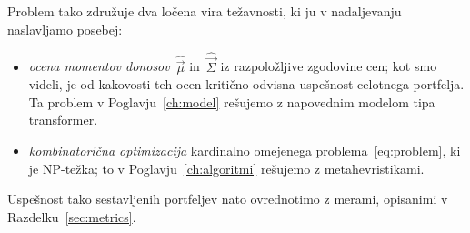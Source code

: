 \noindent Problem tako združuje dva ločena vira težavnosti, ki ju v nadaljevanju naslavljamo posebej:
\begin{itemize}
  \item \emph{ocena momentov donosov}~$\hat{\vec{\mu}}$ in~$\hat{\vec{\Sigma}}$ iz razpoložljive zgodovine cen; kot smo videli, je od kakovosti teh ocen kritično odvisna uspešnost celotnega portfelja. Ta problem v Poglavju~\ref{ch:model} rešujemo z napovednim modelom tipa transformer.
  \item \emph{kombinatorična optimizacija} kardinalno omejenega problema~\eqref{eq:problem}, ki je NP-težka; to v Poglavju~\ref{ch:algoritmi} rešujemo z metahevristikami.
\end{itemize}
Uspešnost tako sestavljenih portfeljev nato ovrednotimo z merami, opisanimi v Razdelku~\ref{sec:metrics}.